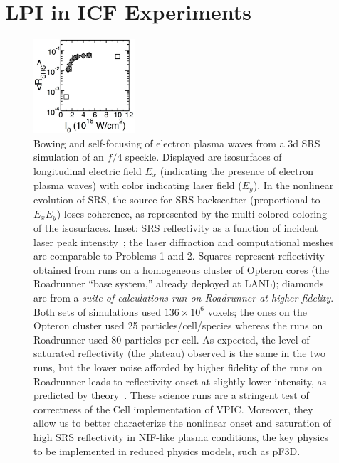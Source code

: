 \documentclass[journal,twoside]{IEEEtran}
\begin{document}
\section{LPI in ICF Experiments}

\begin{figure}
\begin{center}


\vspace{-1.5in}
\hspace{-5.25in}
\includegraphics[height=1.375in]{figs/lpi_comparison.eps}

\vspace{0.125in}
\caption{
Bowing and self-focusing of electron plasma waves from a 3d SRS
simulation of an $f/4$ speckle.  Displayed are isosurfaces of
longitudinal electric field $E_x$ (indicating the presence of electron
plasma waves) with color indicating laser field ($E_y$).  In the
nonlinear evolution of SRS, the source for SRS backscatter
(proportional to $E_x E_y$) loses coherence, as represented by the
multi-colored coloring of the isosurfaces.  Inset: SRS reflectivity as
a function of incident laser peak
intensity~\cite{AAC_Conference_Paper}; the laser diffraction and
computational meshes are comparable to Problems 1 and 2.  Squares
represent reflectivity obtained from runs on a homogeneous cluster of
Opteron cores (the Roadrunner ``base system,'' already deployed at 
LANL); diamonds are from a
\textit{suite of calculations run on Roadrunner at higher fidelity}.
Both sets of simulations used $136 \times 10^6$ voxels; the ones 
on the Opteron cluster used 25 particles/cell/species whereas the
runs on Roadrunner used 80 particles per cell.  
As expected, the level of saturated reflectivity (the plateau)
observed is the same in the two runs, but the lower noise afforded by
higher fidelity of the runs on Roadrunner leads to reflectivity onset
at slightly lower intensity, as predicted by
theory~\cite{Yin_et_al_Phys_Plasmas_2006}.  These science runs are a
stringent test of correctness of the Cell implementation of VPIC.
Moreover, they allow us to better characterize the nonlinear
onset and saturation of high SRS reflectivity in NIF-like plasma
conditions, the key physics to be implemented in reduced physics 
models, such as pF3D.}
\label{fig:lpi}
\end{center}
\end{figure}
\end{document}
